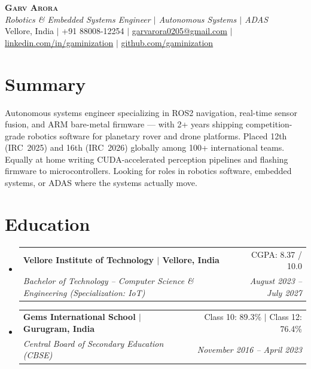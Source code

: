 \documentclass[letterpaper,10pt]{article}
\makeatletter
\newcommand{\resumeSubheading}[4]{
  \item
    \begin{tabular*}{0.97\textwidth}[t]{l@{\extracolsep{\fill}}r}
      \textbf{#1} & #2 \\
      \textit{\small#3} & \textit{\small #4} \\
    \end{tabular*}\vspace{-4pt}
}
\newcommand{\resumeSubHeadingListStart}{
  \begin{itemize}[leftmargin=0.15in, label={}, itemsep=3pt, parsep=0pt, topsep=2pt]
}
\newcommand{\resumeSubHeadingListEnd}{\end{itemize}}
\makeatother
\begin{document}
\begin{center}
    \textbf{\Huge \scshape Garv Arora} \\ \vspace{2pt}
    \small\textit{Robotics \& Embedded Systems Engineer $|$ Autonomous Systems $|$ ADAS} \\ \vspace{2pt}
    \small Vellore, India $|$
    +91 88008-12254 $|$
    \href{mailto:garvarora0205@gmail.com}{garvarora0205@gmail.com} $|$
    \href{https://linkedin.com/in/gaminization}{linkedin.com/in/gaminization} $|$
    \href{https://github.com/gaminization}{github.com/gaminization}
\end{center}

\section{Summary}
\vspace{1pt}
\small{Autonomous systems engineer specializing in ROS2 navigation, real-time sensor fusion, and ARM bare-metal firmware --- with 2+ years shipping competition-grade robotics software for planetary rover and drone platforms. Placed 12th (IRC~2025) and 16th (IRC~2026) globally among 100+ international teams. Equally at home writing CUDA-accelerated perception pipelines and flashing firmware to microcontrollers. Looking for roles in robotics software, embedded systems, or ADAS where the systems actually move.}

\section{Education}
  \resumeSubHeadingListStart
    \resumeSubheading
      {Vellore Institute of Technology $|$ Vellore, India}{CGPA: 8.37 / 10.0}
      {Bachelor of Technology -- Computer Science \& Engineering (Specialization: IoT)}{August 2023 -- July 2027}
    \resumeSubheading
      {Gems International School $|$ Gurugram, India}{Class 10: 89.3\% $|$ Class 12: 76.4\%}
      {Central Board of Secondary Education (CBSE)}{November 2016 -- April 2023}
  \resumeSubHeadingListEnd

\end{document}
